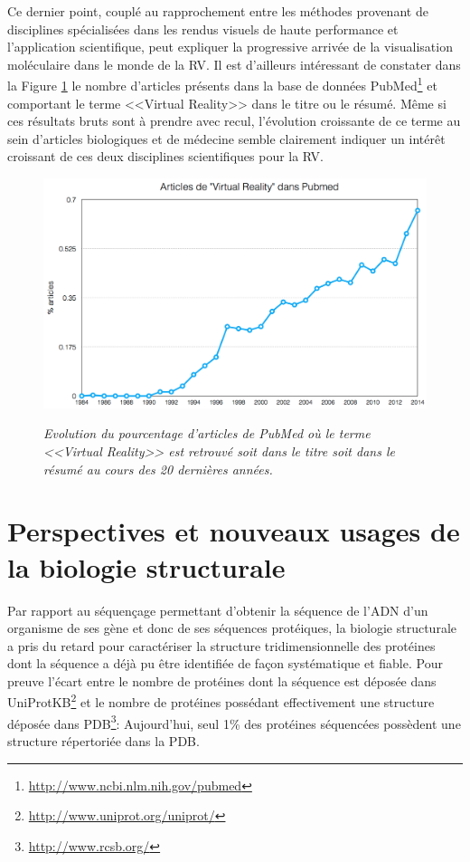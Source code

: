 Ce dernier point, couplé au rapprochement entre les méthodes provenant de disciplines spécialisées dans les rendus visuels de haute performance et l'application scientifique, peut expliquer la progressive arrivée de la visualisation moléculaire dans le monde de la RV. Il est d'ailleurs intéressant de constater dans la Figure \ref{Fig:VR_pubmed_trend} le nombre d'articles présents dans la base de données PubMed\footnote{\url{http://www.ncbi.nlm.nih.gov/pubmed}} et comportant le terme <<Virtual Reality>> dans le titre ou le résumé. Même si ces résultats bruts sont à prendre avec recul, l'évolution croissante de ce terme au sein d'articles biologiques et de médecine semble clairement indiquer un intérêt croissant de ces deux disciplines scientifiques pour la RV.

\begin{figure}
  \centering
  {\includegraphics[width=.75\linewidth]{./figures/ch1/VR_pubmed_trend.png}}
    \caption{{\it Evolution du pourcentage d'articles de PubMed où le terme <<Virtual Reality>> est retrouvé soit dans le titre soit dans le résumé au cours des 20 dernières années.}}
  \label{Fig:VR_pubmed_trend}
  \hspace{0.2cm}
\end{figure}

\section{Perspectives et nouveaux usages de la biologie structurale} \label{limits_persp_bio_struct}

Par rapport au séquençage permettant d'obtenir la séquence de l'ADN d'un organisme de ses gène et donc de ses séquences protéiques, la biologie structurale a pris du retard pour caractériser la structure tridimensionnelle des protéines dont la séquence a déjà pu être identifiée de façon systématique et fiable. Pour preuve l'écart entre le nombre de protéines dont la séquence est déposée dans UniProtKB\footnote{\url{http://www.uniprot.org/uniprot/}} et le nombre de protéines possédant effectivement une structure déposée dans PDB\footnote{\url{http://www.rcsb.org/}}: Aujourd'hui, seul 1\% des protéines séquencées possèdent une structure répertoriée dans la PDB. 

